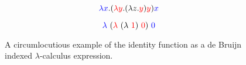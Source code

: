 \begin{figure}[h]

\begin{equation*}
  \textcolor{blue}{\lambda x} . (\textcolor{red}{\lambda y} . (\lambda z . \textcolor{red}{y}) \textcolor{red}{y}) \textcolor{blue}{x}
\end{equation*}

\begin{equation*}
  \textcolor{blue}{\lambda}\ (\textcolor{red}{\lambda}\ (\lambda\ \textcolor{red}{1})\ \textcolor{red}{0})\ \textcolor{blue}{0}
\end{equation*}

\caption{A circumlocutious example of the identity function as a de Bruijn indexed $\lambda$-calculus expression.}
\label{fig:db_example2}
\end{figure}
